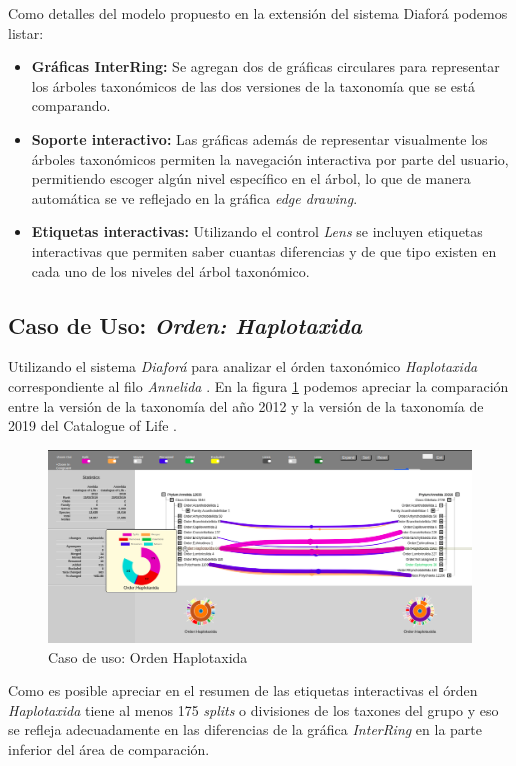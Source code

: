 \documentclass[journal]{IEEEtran}
\begin{document}
Como detalles del modelo propuesto en la extensión del sistema Diaforá podemos listar:

\begin{itemize}
  \item \textbf{Gráficas InterRing:} Se agregan dos de gráficas circulares para representar los árboles taxonómicos de las
  dos versiones de la taxonomía que se está comparando.
  \item  \textbf{Soporte interactivo:} Las gráficas además de representar visualmente los árboles taxonómicos permiten la navegación interactiva
  por parte del usuario, permitiendo escoger algún nivel específico en el árbol, lo que de manera automática se ve reflejado en la gráfica \emph{edge drawing}.
  \item \textbf{Etiquetas interactivas:} Utilizando el control \emph{Lens} se incluyen etiquetas interactivas que permiten saber cuantas diferencias y de que tipo existen
  en cada uno de los niveles del árbol taxonómico.
\end{itemize}

\subsection{Caso de Uso: \emph{Orden: Haplotaxida}}
Utilizando el sistema \emph{Diaforá} para analizar el órden taxonómico \emph{Haplotaxida} correspondiente al filo \emph{Annelida} \cite{nguyen_nguyen_tran_blakemore_2016}.
En la figura \ref{haplotaxida} podemos apreciar la comparación entre la versión de la taxonomía del año 2012 y la versión de la taxonomía de 2019 del Catalogue of Life \cite{catalogueoflife}.
\begin{figure}[]
  \centering
  \includegraphics[scale=1.5]{useCaseHaplotaxida.png}
  \caption{Caso de uso: Orden Haplotaxida}
  \label{haplotaxida}
\end{figure}

Como es posible apreciar en el resumen de las etiquetas interactivas el órden \emph{Haplotaxida} tiene al menos 175 \emph{splits} o divisiones de los taxones del grupo y eso se refleja adecuadamente en las diferencias de la gráfica \emph{InterRing} en la parte inferior del área de comparación.
\end{document}

